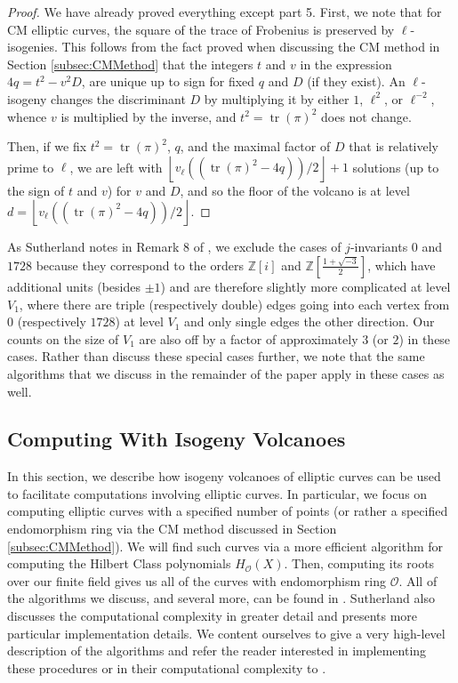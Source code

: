 \documentclass{amsart}
\theoremstyle{definition}
\theoremstyle{remark}
\numberwithin{equation}{section}
\newcommand{\cO}{\mathcal O}
\newcommand{\bbZ}{\mathbb Z}
\DeclareMathOperator{\tr}{tr}
\begin{document}
  \begin{proof}
  We have already proved everything except part 5. First, we note that for CM elliptic curves, the square of the trace of Frobenius is preserved by $\ell$-isogenies. This follows from the fact proved when discussing the CM method in Section \ref{subsec:CMMethod} that the integers $t$ and $v$ in the expression $4q = t^2 - v^2 D$, are unique up to sign for fixed $q$ and $D$ (if they exist). An $\ell$-isogeny changes the discriminant $D$ by multiplying it by either $1$, $\ell^2$, or $\ell^{-2}$, whence $v$ is multiplied by the inverse, and $t^2 = \tr(\pi)^2$ does not change.
  
  Then, if we fix $t^2 = \tr(\pi)^2$, $q$, and the maximal factor of $D$   that is relatively prime to $\ell$, we are left with $\left\lfloor v_{\ell}((\tr(\pi)^2 - 4q))/2 \right\rfloor + 1$ solutions (up to the sign of $t$ and $v$) for $v$ and $D$, and so the floor of the volcano is at level $d = \left\lfloor v_{\ell}((\tr(\pi)^2 - 4q))/2 \right\rfloor$.
  \end{proof}
  
  As Sutherland notes in Remark 8 of \cite{SutherlandIV}, we exclude the cases of $j$-invariants $0$ and $1728$ because they correspond to the orders $\bbZ[i]$ and $\bbZ\left[\frac{1 + \sqrt{-3}}{2}\right]$, which have additional units (besides $\pm 1$) and are therefore slightly more complicated at level $V_{1}$, where there are triple (respectively double) edges going into each vertex from $0$ (respectively $1728$) at level $V_{1}$ and only single edges the other direction. Our counts on the size of $V_1$ are also off by a factor of approximately $3$ (or $2$) in these cases. Rather than discuss these special cases further, we note that the same algorithms that we discuss in the remainder of the paper apply in these cases as well.
  
\subsection{Computing With Isogeny Volcanoes} \label{subsec:UsingIsogenyVolcanoes}

In this section, we describe how isogeny volcanoes of elliptic curves can be used to facilitate computations involving elliptic curves. In particular, we focus on computing elliptic curves with a specified number of points (or rather a specified endomorphism ring via the CM method discussed in Section \ref{subsec:CMMethod}). We will find such curves via a more efficient algorithm for computing the Hilbert Class polynomials $H_{\cO}(X)$. Then, computing its roots over our finite field gives us all of the curves with endomorphism ring $\cO$. All of the algorithms we discuss, and several more, can be found in \cite{SutherlandIV}. Sutherland also discusses the computational complexity in greater detail and presents more particular implementation details. We content ourselves to give a very high-level description of the algorithms and refer the reader interested in implementing these procedures or in their computational complexity to \cite{SutherlandIV}.
\end{document}
